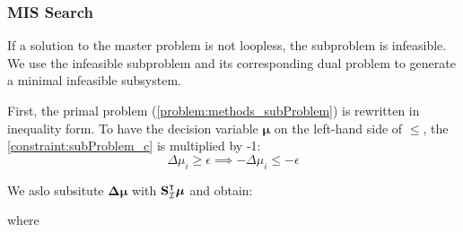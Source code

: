 \subsubsection*{MIS Search} \label{section:methods_mis} 
If a solution to the master problem is not loopless, the subproblem is infeasible.
We use the infeasible subproblem and its corresponding dual problem to generate a minimal infeasible subsystem. 

First, the primal problem (\cref{problem:methods_subProblem}) is rewritten in inequality form.
To have the decision variable $\boldsymbol \mu$ on the left-hand side of $\leq$, the \cref{constraint:subProblem_c} is multiplied by -1:
\begin{equation*}
    \Delta \mu_i \geq \epsilon \implies - \Delta \mu_i \leq -\epsilon
\end{equation*}

We aslo subsitute $\boldsymbol{\Delta \mu}$ with $\bold S_{\mathcal{I}}^\intercal \boldsymbol \mu$
and obtain:
\quad where %

